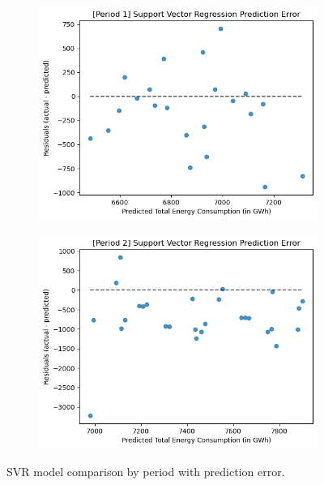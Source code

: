 \documentclass[runningheads]{llncs}
\begin{document}
\begin{center}
\begin{figure}[h]
\begin{subfigure}[h]{0.6\textwidth}
         \caption{}
         \label{fig:resultSVR-p2}
    \end{subfigure}
    \begin{subfigure}[h]{0.60\textwidth}
         \centering
         \hspace*{-1.3in}
         \includegraphics[width=\textwidth]{results/svr/erp1.png}
         \caption{}
         \label{fig:errorSVR-p1}
    \end{subfigure}
    \begin{subfigure}[h]{0.60\textwidth}
         \centering
         \hspace*{-1.3in}
         \includegraphics[width=\textwidth]{results/svr/erp2.png}
         \caption{}
         \label{fig:errorSVR-p2}
    \end{subfigure}
    \caption{SVR model comparison by period with prediction error.}
    \label{fig:svrwitherror}
\end{figure}
\end{center}
\end{document}
